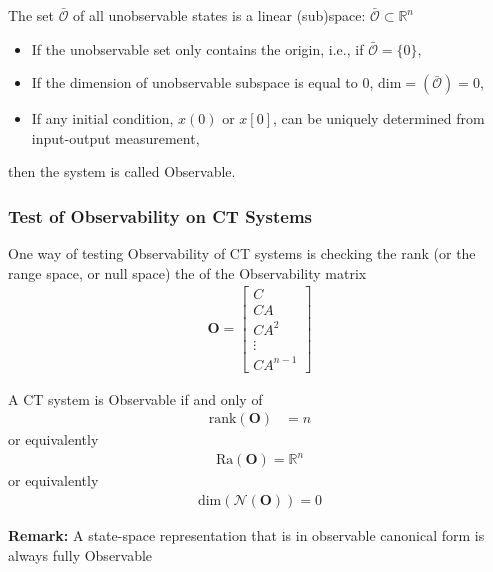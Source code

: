 \documentclass[twoside]{article}
\begin{document}
  The set $\bar{\mathcal{O}}$ of all unobservable states is a linear
  (sub)space: $\bar{\mathcal{O}} \subset \mathbb{R}^n$

\begin{itemize}
%
 \item If the unobservable set only contains the origin, 
   i.e., if $\bar{\mathcal{O}} = \lbrace 0 \rbrace$, 
%
 \item If the dimension of unobservable subspace is equal to 0,
   $\mathrm{dim} = \left( \bar{\mathcal{O}} \right) = 0$,
 \item If any initial condition, $x(0)$ or $x[0]$, can be uniquely 
 determined from input-output measurement,
%
\end{itemize} 
then the system is called Observable. 

\subsubsection{Test of Observability on CT Systems}

One way of testing Observability of CT systems is checking the rank
(or the range space, or null space) the of the Observability matrix
%
\begin{align*}
  \mathbf{O} =
\left[ \begin{array}{c}
C 
\\
C A
\\
C A^2 
\\
  \vdots
\\
C A^{n-1}
\end{array}
\right] 
\end{align*} 
%

A CT system is Observable if and only of
%
\begin{align*}
  \mathrm{rank} ( \mathbf{O} ) &= n
\end{align*} 
%
or equivalently 
%
\begin{align*}
 \mathrm{Ra} ( \mathbf{O} ) = \mathbb{R}^n
\end{align*} 
%
or equivalently 
%
\begin{align*}
 \mathrm{dim} \left ( \mathcal{N} ( \mathbf{O} ) \right) = 0
\end{align*} 

\vspace{6pt}

\textbf{Remark:} A state-space representation that is
in observable canonical form is always fully Observable

\vspace{6pt}
\end{document}
